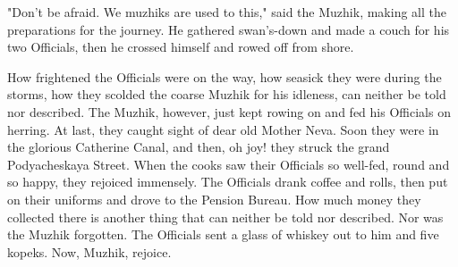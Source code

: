"Don't be afraid. We muzhiks are used to this," said the Muzhik,
making all the preparations for the journey. He gathered swan's-down
and made a couch for his two Officials, then he crossed himself and
rowed off from shore.

How frightened the Officials were on the way, how seasick they were
during the storms, how they scolded the coarse Muzhik for his
idleness, can neither be told nor described. The Muzhik, however, just
kept rowing on and fed his Officials on herring. At last, they caught
sight of dear old Mother Neva. Soon they were in the glorious
Catherine Canal, and then, oh joy! they struck the grand Podyacheskaya
Street. When the cooks saw their Officials so well-fed, round and so
happy, they rejoiced immensely. The Officials drank coffee and rolls,
then put on their uniforms and drove to the Pension Bureau. How much
money they collected there is another thing that can neither be told
nor described. Nor was the Muzhik forgotten. The Officials sent a
glass of whiskey out to him and five kopeks. Now, Muzhik, rejoice.
